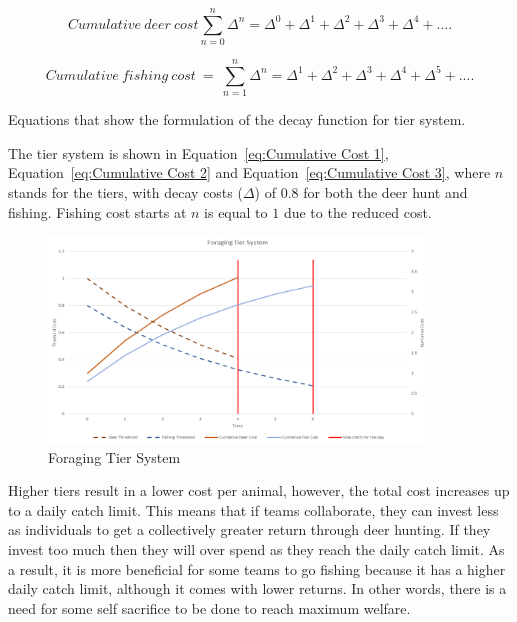 \begin{equation}
Cumulative\ deer \ cost \sum_{n=0}^{n} \Delta^{n} = \Delta^{0} + \Delta^{1} + \Delta^{2} + \Delta^{3} + \Delta^{4} + ....
\label{eq:Cumulative Cost 2}
\end{equation}

\begin{equation}
Cumulative\ fishing\ cost \ = \ \sum_{n=1}^{n} \Delta^{n} = \Delta^{1} + \Delta^{2} + \Delta^{3} + \Delta^{4} + \Delta^{5} + ....
\label{eq:Cumulative Cost 3}
\end{equation}

Equations that show the formulation of the decay function for tier system.

The tier system is shown in Equation~\eqref{eq:Cumulative Cost 1}, Equation~\eqref{eq:Cumulative Cost 2} and Equation~\eqref{eq:Cumulative Cost 3}, where $n$ stands for the tiers, with decay costs ($\Delta$) of $0.8$ for both the deer hunt and fishing. Fishing cost starts at $n$ is equal to $1$ due to the reduced cost.

\begin{figure}[!htb]
    \centering
    \includegraphics[width=0.9\textwidth]{04_environment/Images/Foraging Tier System.PNG}
    \caption{Foraging Tier System}
    \label{fig:Foraging Tier System}
\end{figure}

Higher tiers result in a lower cost per animal, however, the total cost increases up to a daily catch limit.
This means that if teams collaborate, they can invest less as individuals to get a collectively greater return through deer hunting. If they invest too much then they will over spend as they reach the daily catch limit. As a result, it is more beneficial for some teams to go fishing because it has a higher daily catch limit, although it comes with lower returns. In other words, there is a need for some self sacrifice to be done to reach maximum welfare.

